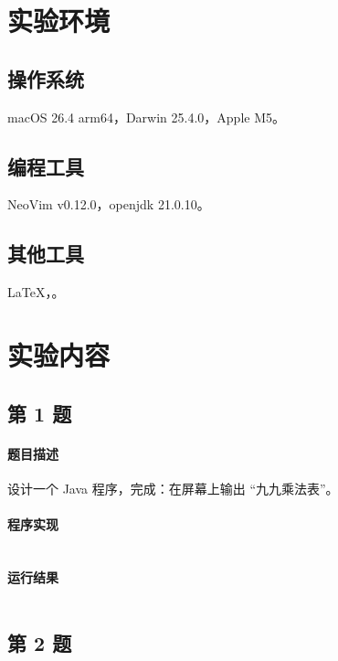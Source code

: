 \documentclass{academics}
\begin{document}
\makeacademicscover

\section{实验环境}

\subsection{操作系统}

macOS 26.4 arm64，Darwin 25.4.0，Apple M5。

\subsection{编程工具}

NeoVim v0.12.0，openjdk 21.0.10。

\subsection{其他工具}

\LaTeX{}，。

\section{实验内容}

\subsection{第 1 题}

\paragraph{题目描述} {
    设计一个 Java 程序，完成：在屏幕上输出 ``九九乘法表''。
}

\paragraph{程序实现} {
    \inputminted[label=Solution.java]{java}{../src/P01/Solution.java}
}

\paragraph{运行结果} {
    \inputminted{text}{../res/P01.out}
}

\subsection{第 2 题}
\end{document}
